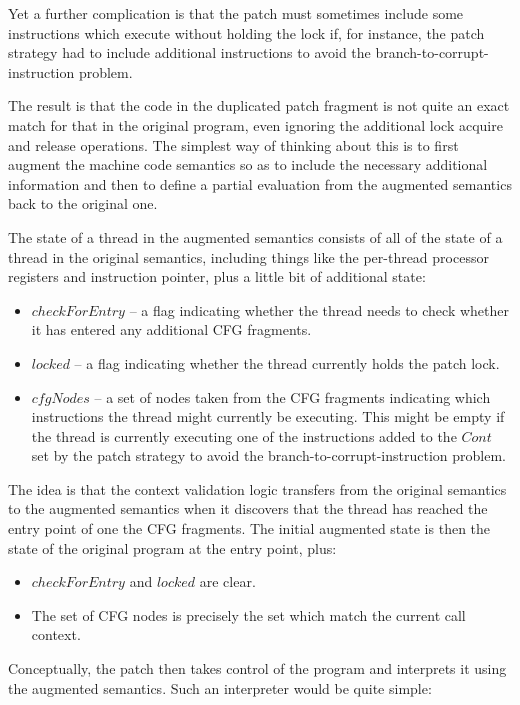 Yet a further complication is that the patch must sometimes include
some instructions which execute without holding the lock if, for
instance, the patch strategy had to include additional instructions to
avoid the branch-to-corrupt-instruction problem.

The result is that the code in the duplicated patch fragment is not
quite an exact match for that in the original program, even ignoring
the additional lock acquire and release operations.  The simplest way
of thinking about this is to first augment the machine code semantics
so as to include the necessary additional information and then to
define a partial evaluation from the augmented semantics back to the
original one.

The state of a thread in the augmented semantics consists of all of
the state of a thread in the original semantics, including things like
the per-thread processor registers and instruction pointer, plus a
little bit of additional state:

\begin{itemize}
\item $checkForEntry$ -- a flag indicating whether the thread needs to
  check whether it has entered any additional CFG fragments.
\item $locked$ -- a flag indicating whether the thread currently holds
  the patch lock.
\item $cfgNodes$ -- a set of nodes taken from the CFG fragments
  indicating which instructions the thread might currently be
  executing.  This might be empty if the thread is currently executing
  one of the instructions added to the $Cont$ set by the patch
  strategy to avoid the branch-to-corrupt-instruction problem.
\end{itemize}

The idea is that the context validation logic transfers from the
original semantics to the augmented semantics when it discovers that
the thread has reached the entry point of one the CFG fragments.  The
initial augmented state is then the state of the original program at
the entry point, plus:

\begin{itemize}
\item $checkForEntry$ and $locked$ are clear.
\item The set of CFG nodes is precisely the set which match the
  current call context.
\end{itemize}

Conceptually, the patch then takes control of the program and
interprets it using the augmented semantics.  Such an interpreter
would be quite simple:

